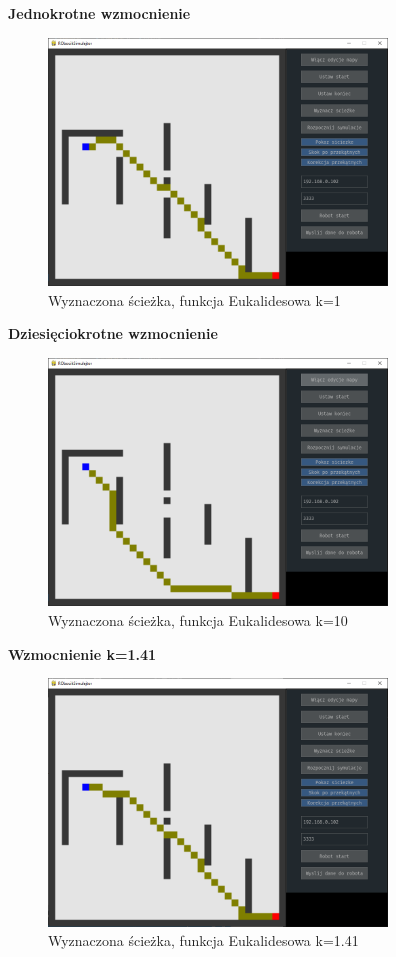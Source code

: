 \textbf{Jednokrotne wzmocnienie}
\begin{figure}[H]
	\centering
	\includegraphics[width=9cm]{pages/testy/zdjecia/test3_ekualides_k1.png}
	\caption{Wyznaczona ścieżka, funkcja Eukalidesowa k=1}
\end{figure}
\textbf{Dziesięciokrotne wzmocnienie}

\begin{figure}[H]
	\centering
	\includegraphics[width=9cm]{pages/testy/zdjecia/test3_ekualides_k10.png}
	\caption{Wyznaczona ścieżka, funkcja Eukalidesowa k=10}
\end{figure}
\textbf{Wzmocnienie k=1.41}

\begin{figure}[H]
	\centering
	\includegraphics[width=9cm]{pages/testy/zdjecia/test3_ekualides_k141.png}
	\caption{Wyznaczona ścieżka, funkcja Eukalidesowa k=1.41}
\end{figure}

